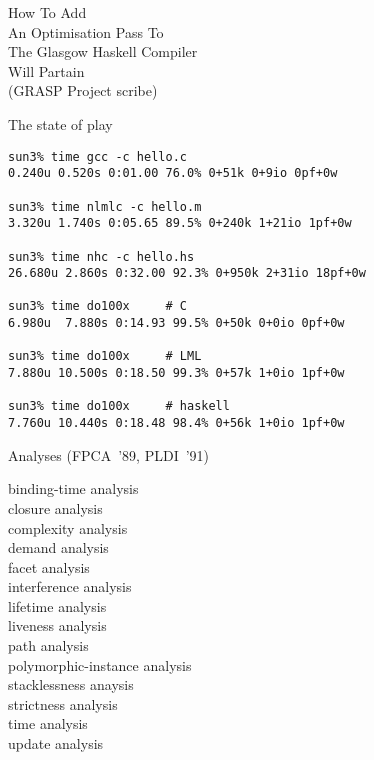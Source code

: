 \begin{slide}{}
\begin{center}
{\Large
How To Add\\
An Optimisation Pass To\\
The Glasgow Haskell Compiler\\[40pt]
}
{\large
Will Partain\\
(GRASP Project scribe)
}
\end{center}
\end{slide}

\begin{slide}{}
{\Large The state of play}

\begin{verbatim}
sun3% time gcc -c hello.c
0.240u 0.520s 0:01.00 76.0% 0+51k 0+9io 0pf+0w

sun3% time nlmlc -c hello.m
3.320u 1.740s 0:05.65 89.5% 0+240k 1+21io 1pf+0w

sun3% time nhc -c hello.hs
26.680u 2.860s 0:32.00 92.3% 0+950k 2+31io 18pf+0w

sun3% time do100x     # C
6.980u  7.880s 0:14.93 99.5% 0+50k 0+0io 0pf+0w

sun3% time do100x     # LML
7.880u 10.500s 0:18.50 99.3% 0+57k 1+0io 1pf+0w

sun3% time do100x     # haskell
7.760u 10.440s 0:18.48 98.4% 0+56k 1+0io 1pf+0w
\end{verbatim}
\end{slide}

\begin{slide}{}
{\Large Analyses (FPCA~'89, PLDI~'91)}

binding-time analysis\\
closure analysis\\
complexity analysis\\
demand analysis\\
facet analysis\\
interference analysis\\
lifetime analysis\\
liveness analysis\\
path analysis\\
polymorphic-instance analysis\\
stacklessness anaysis\\
strictness analysis\\
time analysis\\
update analysis
\end{slide}

